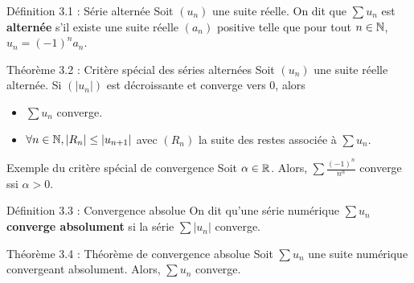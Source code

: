 \begin{theorem}[red]{Définition 3.1 : Série alternée}
    Soit $(u_n)$ une suite réelle. On dit que $\sum u_n$ est \textbf{alternée} s'il existe une suite réelle $(a_n)$ positive telle que pour tout $n \in \mathbb{N}$, $u_n = (-1)^n a_n$.
\end{theorem}

\begin{theorem}[orange]{Théorème 3.2 : Critère spécial des séries alternées}
    Soit $(u_n)$ une suite réelle alternée. Si $(|u_n|)$ est décroissante et converge vers 0, alors

    \begin{itemize}
        \item $\sum u_n$ converge.
        \item $\forall n \in \mathbb{N}, |R_n| \leq |u_{n + 1}|$ \hspace{5px} avec $(R_n)$ la suite des restes associée à $\sum u_n$.
    \end{itemize}
\end{theorem}

\begin{theorem}[black]{Exemple du critère spécial de convergence}
    Soit $\alpha \in \mathbb{R}$. Alors, $\displaystyle \sum \frac{(-1)^n}{n^\alpha}$ converge ssi $\alpha > 0$.
\end{theorem}

\begin{theorem}[blue]{Définition 3.3 : Convergence absolue}
    On dit qu'une série numérique $\sum u_n$ \textbf{converge absolument} si la série $\sum | u_n |$ converge.
\end{theorem}

\begin{theorem}[orange]{Théorème 3.4 : Théorème de convergence absolue}
    Soit $\sum u_n$ une suite numérique convergeant absolument. Alors, $\sum u_n$ converge.
\end{theorem}